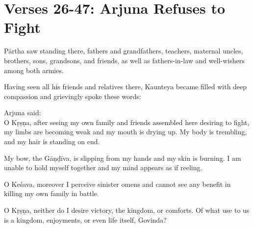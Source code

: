 \section{Verses 26-47: Arjuna Refuses to Fight}\label{sec-verses-26-47-arjuna-refuses-to-fight}
{Pārtha saw standing there, fathers and grandfathers,
teachers, maternal uncles, brothers, sons, grandsons, and friends, as well as fathers-in-law and well-wishers among both armies.}

{Having seen all his friends and relatives there, Kaunteya became filled with deep compassion and grievingly spoke these words:}

{\hspace*{1em}Arjuna said: \\
O Kṛṣṇa, after seeing my own family and friends assembled here desiring to fight, my limbs are becoming weak and my mouth is drying up. My body is trembling, and my hair is standing on end.}

{My bow, the Gāṇḍīva, is slipping from my hands and my skin is burning. I am unable to hold myself together and my mind appears as if reeling.}

{O Keśava, moreover I perceive sinister omens and cannot see any benefit in killing my own family in battle.}

{O Kṛṣṇa, neither do I desire victory, the kingdom, or comforts. Of what use to us is a kingdom, enjoyments, or even life itself, Govinda?}

